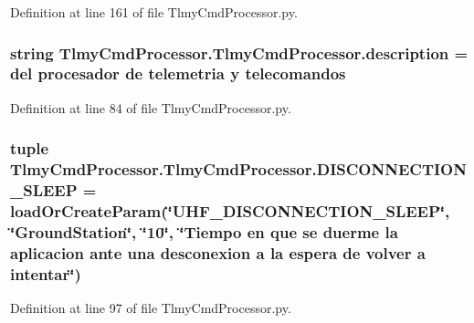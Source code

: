 Definition at line 161 of file Tlmy\+Cmd\+Processor.\+py.

\hypertarget{namespace_tlmy_cmd_processor_1_1_tlmy_cmd_processor_af826240cd995d7339c5f281ee8941333}{}
\subsubsection[{description}]{\setlength{\rightskip}{0pt plus 5cm}string Tlmy\+Cmd\+Processor.\+Tlmy\+Cmd\+Processor.\+description =  del procesador de telemetria y telecomandos\textquotesingle{}}\label{namespace_tlmy_cmd_processor_1_1_tlmy_cmd_processor_af826240cd995d7339c5f281ee8941333}


Definition at line 84 of file Tlmy\+Cmd\+Processor.\+py.

\hypertarget{namespace_tlmy_cmd_processor_1_1_tlmy_cmd_processor_a053a883aeff5a224089cd5c791e2bc4c}{}
\subsubsection[{D\+I\+S\+C\+O\+N\+N\+E\+C\+T\+I\+O\+N\+\_\+\+S\+L\+E\+E\+P}]{\setlength{\rightskip}{0pt plus 5cm}tuple Tlmy\+Cmd\+Processor.\+Tlmy\+Cmd\+Processor.\+D\+I\+S\+C\+O\+N\+N\+E\+C\+T\+I\+O\+N\+\_\+\+S\+L\+E\+E\+P = load\+Or\+Create\+Param(\char`\"{}U\+H\+F\+\_\+\+D\+I\+S\+C\+O\+N\+N\+E\+C\+T\+I\+O\+N\+\_\+\+S\+L\+E\+E\+P\char`\"{}, \char`\"{}Ground\+Station\char`\"{}, \char`\"{}10\char`\"{}, \char`\"{}Tiempo en que se duerme la aplicacion ante una desconexion {\bf a} la espera de volver {\bf a} intentar\char`\"{})}\label{namespace_tlmy_cmd_processor_1_1_tlmy_cmd_processor_a053a883aeff5a224089cd5c791e2bc4c}


Definition at line 97 of file Tlmy\+Cmd\+Processor.\+py.

\hypertarget{namespace_tlmy_cmd_processor_1_1_tlmy_cmd_processor_a8f2365862c9bbb4fe399b2d3f801b4d5}{}
